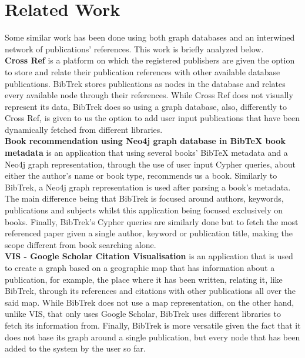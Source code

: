 \documentclass[twocolumn]{article}
\begin{document}
\section{Related Work}
Some similar work has been done using both graph databases and an interwined network of publications' references. This work is briefly analyzed below.\\[1\baselineskip]
\textbf{Cross Ref} \cite{crossref} is a platform on which the registered publishers are given the option to store and relate their publication references with other available database publications. BibTrek stores publications as nodes in the database and relates every available node through their references. While Cross Ref does not visually represent its data, BibTrek does so using a graph database, also, differently to Cross Ref, is given to us the option to add user input publications that have been dynamically fetched from different libraries.\\[1\baselineskip]
\textbf{Book recommendation using Neo4j graph database in BibTeX book metadata} \cite{bookrecusingneo4j} is an application that using several books' BibTeX metadata and a Neo4j graph representation, through the use of user input Cypher queries, about either the author's name or book type, recommends us a book. Similarly to BibTrek, a Neo4j graph representation is used after parsing a book's metadata. The main difference being that BibTrek is focused around authors, keywords, publications and subjects whilst this application being focused exclusively on books. Finally, BibTrek's Cypher queries are similarly done but to fetch the most referenced paper given a single author, keyword or publication title, making the scope different from book searching alone.\\[1\baselineskip]
\textbf{VIS - Google Scholar Citation Visualisation} \cite{vis} is an application that is used to create a graph based on a geographic map that has information about a publication, for example, the place where it has been written, relating it, like BibTrek, through its references and citations with other publications all over the said map. While BibTrek does not use a map representation, on the other hand, unlike VIS, that only uses Google Scholar, BibTrek uses different libraries to fetch its information from. Finally, BibTrek is more versatile given the fact that it does not base its graph around a single publication, but every node that has been added to the system by the user so far.
\end{document}
